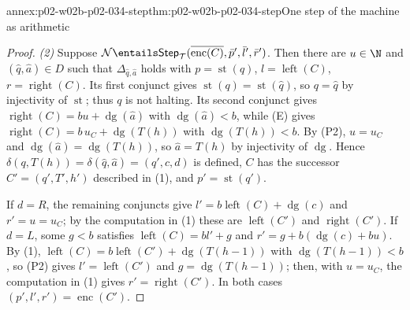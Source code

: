 \begin{annexitem}{annex:p02-w02b-p02-034-step}{thm:p02-w02b-p02-034-step}{One step of the machine as arithmetic}
\begin{proof}
\emph{(2)}  Suppose
\(\mathcal N\entails\mathsf{Step}_{\mathcal T}(\overline{\operatorname{enc}(C)},\bar p',\bar l',\bar r')\).
Then there are \(u\in\N\) and \((\hat q,\hat a)\in D\) such that
\(\Delta_{\hat q,\hat a}\) holds with \(p=\operatorname{st}(q)\),
\(l=\operatorname{left}(C)\), \(r=\operatorname{right}(C)\).  Its first
conjunct gives \(\operatorname{st}(q)=\operatorname{st}(\hat q)\), so
\(q=\hat q\) by injectivity of \(\operatorname{st}\); thus \(q\) is not
halting.  Its second conjunct gives
\(\operatorname{right}(C)=bu+\operatorname{dg}(\hat a)\) with
\(\operatorname{dg}(\hat a)<b\), while (E) gives
\(\operatorname{right}(C)=b\,u_C+\operatorname{dg}(T(h))\) with
\(\operatorname{dg}(T(h))<b\).  By (P2), \(u=u_C\) and
\(\operatorname{dg}(\hat a)=\operatorname{dg}(T(h))\), so \(\hat a=T(h)\) by
injectivity of \(\operatorname{dg}\).  Hence \(\delta(q,T(h))=\delta(\hat q,\hat a)=(q',c,d)\)
is defined, \(C\) has the successor \(C'=(q',T',h')\) described in (1), and
\(p'=\operatorname{st}(q')\).

If \(d=R\), the remaining conjuncts give
\(l'=b\operatorname{left}(C)+\operatorname{dg}(c)\) and \(r'=u=u_C\); by the
computation in (1) these are \(\operatorname{left}(C')\) and
\(\operatorname{right}(C')\).  If \(d=L\), some \(g<b\) satisfies
\(\operatorname{left}(C)=bl'+g\) and
\(r'=g+b(\operatorname{dg}(c)+bu)\).  By (1),
\(\operatorname{left}(C)=b\operatorname{left}(C')+\operatorname{dg}(T(h-1))\)
with \(\operatorname{dg}(T(h-1))<b\), so (P2) gives
\(l'=\operatorname{left}(C')\) and \(g=\operatorname{dg}(T(h-1))\); then, with
\(u=u_C\), the computation in (1) gives \(r'=\operatorname{right}(C')\).  In
both cases \((p',l',r')=\operatorname{enc}(C')\).
\end{proof}
\end{annexitem}

